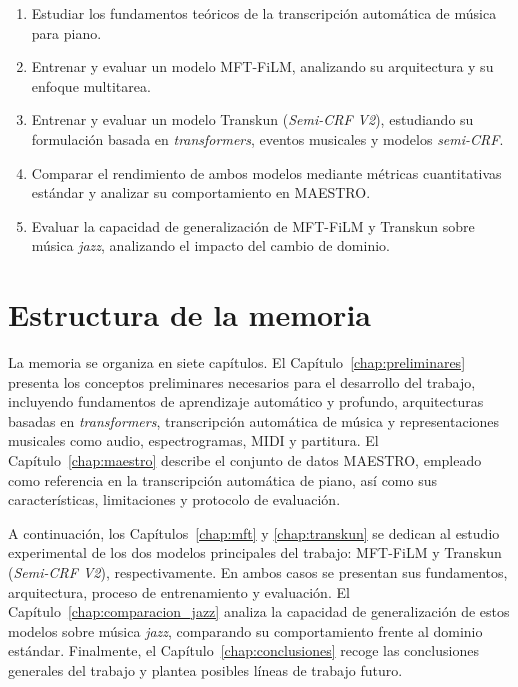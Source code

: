 \documentclass[11pt,spanish,listoffigures,listoftables]{tfgetsinf}
\begin{document}
\begin{enumerate}
    \item Estudiar los fundamentos teóricos de la transcripción automática de
    música para piano.

    \item Entrenar y evaluar un modelo MFT-FiLM, analizando su arquitectura y su enfoque multitarea.

    \item Entrenar y evaluar un modelo Transkun (\textit{Semi-CRF V2}), estudiando
    su formulación basada en \textit{transformers}, eventos musicales y modelos
    \textit{semi-CRF}.

    \item Comparar el rendimiento de ambos modelos mediante métricas
    cuantitativas estándar y analizar su comportamiento en MAESTRO.

    \item Evaluar la capacidad de generalización de MFT-FiLM y Transkun sobre
    música \textit{jazz}, analizando el impacto del cambio de dominio.
\end{enumerate}



\section{Estructura de la memoria}

La memoria se organiza en siete capítulos. El
Capítulo~\ref{chap:preliminares} presenta los conceptos preliminares necesarios para el desarrollo del
trabajo, incluyendo fundamentos de aprendizaje automático y profundo,
arquitecturas basadas en \textit{transformers}, transcripción automática de
música y representaciones musicales como audio, espectrogramas, MIDI y
partitura. El Capítulo~\ref{chap:maestro} describe el conjunto de datos MAESTRO, empleado como
referencia en la transcripción automática de piano, así como sus características,
limitaciones y protocolo de evaluación.

A continuación, los Capítulos~\ref{chap:mft} y \ref{chap:transkun} se dedican al estudio experimental de los
dos modelos principales del trabajo: MFT-FiLM y Transkun (\textit{Semi-CRF V2}),
respectivamente. En ambos casos se presentan sus fundamentos, arquitectura,
proceso de entrenamiento y evaluación. El Capítulo~\ref{chap:comparacion_jazz} analiza la capacidad de
generalización de estos modelos sobre música \textit{jazz}, comparando su comportamiento
frente al dominio estándar. Finalmente, el Capítulo~\ref{chap:conclusiones} recoge las conclusiones
generales del trabajo y plantea posibles líneas de trabajo futuro.
\end{document}
